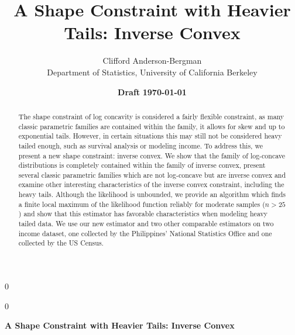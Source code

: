 \documentclass[11pt]{article}
\date{\textbf{Draft} \textbf{\today}}
\newcommand{\blind}{0}
\numberwithin{equation}{section}
\begin{document}
%


\def\spacingset#1{\renewcommand{\baselinestretch}%
{#1}\small\normalsize} \spacingset{1}



\blind
{
  \title{A Shape Constraint with Heavier Tails: Inverse Convex}
  \author{Clifford Anderson-Bergman\\
    Department of Statistics, University of California Berkeley\\
    }
  \maketitle
} \fi

\blind
{
  \bigskip
  \bigskip
  \bigskip
  \begin{center}
    {\large\bf A Shape Constraint with Heavier Tails: Inverse Convex}
\end{center}
  \medskip
} \fi


\spacingset{1.4}


\begin{abstract}

	The shape constraint of log concavity is considered a fairly flexible constraint, as many classic parametric families are contained within the family, it allows for skew and up to exponential tails. However, in certain situations this may still not be considered heavy tailed enough, such as survival analysis or modeling income. To address this, we present a new shape constraint: inverse convex. We show that the family of log-concave distributions is completely contained within the family of inverse convex, present several classic parametric families which are not log-concave but are inverse convex and examine other interesting characteristics of the inverse convex constraint, including the heavy tails. Although the likelihood is unbounded, we provide an algorithm which finds a finite local maximum of the likelihood function reliably for moderate samples ($n > 25$) and show that this estimator has favorable characteristics when modeling heavy tailed data. We use our new estimator and two other comparable estimators on two income dataset, one collected by the Philippines' National Statistics Office and one collected by the US Census. 
	
\end{abstract}
\end{document}

